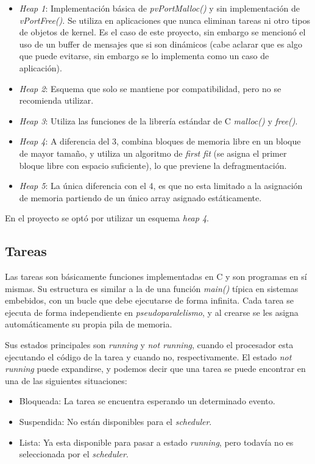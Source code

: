 \documentclass{IEEEtran}
\begin{document}
\begin{itemize}
    \item \textit{Heap 1}: Implementación básica de \textit{pvPortMalloc()} y sin implementación de \textit{vPortFree()}. Se utiliza en aplicaciones que nunca eliminan tareas ni otro tipos de objetos de kernel. Es el caso de este proyecto, sin embargo se mencionó el uso de un buffer de mensajes que si son dinámicos (cabe aclarar que es algo que puede evitarse, sin embargo se lo implementa como un caso de aplicación).
    \item \textit{Heap 2}: Esquema que solo se mantiene por compatibilidad, pero no se recomienda utilizar.
    \item \textit{Heap 3}: Utiliza las funciones de la librería estándar de C \textit{malloc()} y \textit{free()}.
    \item \textit{Heap 4}: A diferencia del 3, combina bloques de memoria libre en un bloque de mayor tamaño, y utiliza un algoritmo de \textit{first fit} (se asigna el primer bloque libre con espacio suficiente), lo que previene la defragmentación.
    \item \textit{Heap 5}: La única diferencia con el 4, es que no esta limitado a la asignación de memoria partiendo de un único array asignado estáticamente.
\end{itemize}

En el proyecto se optó por utilizar un esquema \textit{heap 4}.

\subsection{Tareas}
Las tareas son básicamente funciones implementadas en C y son programas en sí mismas. Su estructura es similar a la de una función \textit{main()} típica en sistemas embebidos, con un bucle que debe ejecutarse de forma infinita. Cada tarea se ejecuta de forma independiente en \textit{pseudoparalelismo}, y al crearse se les asigna automáticamente su propia pila de memoria.

Sus estados principales son \textit{running} y \textit{not running}, cuando el procesador esta ejecutando el código de la tarea y cuando no, respectivamente. El estado \textit{not running} puede expandirse, y podemos decir que una tarea se puede encontrar en una de las siguientes situaciones:

\begin{itemize}
    \item Bloqueada: La tarea se encuentra esperando un determinado evento.
    \item Suspendida: No están disponibles para el \textit{scheduler}.
    \item Lista: Ya esta disponible para pasar a estado \textit{running}, pero todavía no es seleccionada por el \textit{scheduler}.
\end{itemize}
\end{document}
